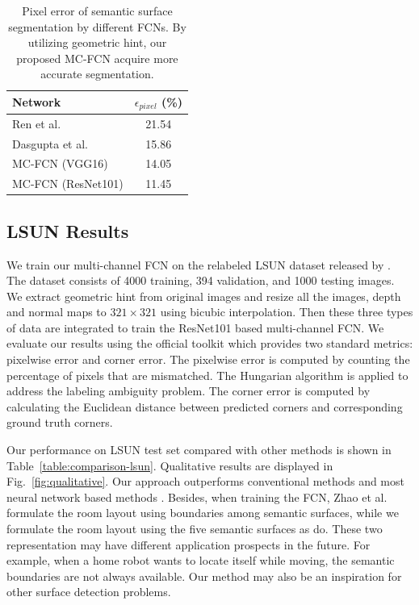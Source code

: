 \begin{table}
	\centering
	\begin{tabular}{l|c} 
		\hline
		Network & $\epsilon_{pixel}$ (\%)\\
		\hline
		Ren et al.~\cite{ren2016coarse} & 21.54 \\
		Dasgupta et al.~\cite{dasgupta2016delay} & 15.86 \\  \hline
		MC-FCN (VGG16)  & 14.05 \\
		MC-FCN (ResNet101) & 11.45 \\
		\hline
	\end{tabular}
	\caption{Pixel error of semantic surface segmentation by different FCNs. By utilizing geometric hint, our proposed MC-FCN acquire more accurate segmentation. }	
	\label{table:ablation}
\end{table}

\subsection{LSUN Results}
\label{sec:LSUN}
We train our multi-channel FCN on the relabeled LSUN dataset released by \cite{ren2016coarse}. The dataset consists of 4000 training, 394 validation, and 1000 testing images. We extract geometric hint from original images and resize all the images, depth and normal maps to $321\times321$ using bicubic interpolation. Then these three types of data are integrated to train the ResNet101 based multi-channel FCN. We evaluate our results using the official toolkit which provides two standard metrics: pixelwise error and corner error. The pixelwise error is computed by counting the percentage of pixels that are mismatched. The Hungarian algorithm is applied to address the labeling ambiguity problem.
The corner error is computed by calculating the Euclidean distance between predicted corners and corresponding ground truth corners.

Our performance on LSUN test set compared with other methods is shown in Table~\ref{table:comparison-lsun}. Qualitative results are displayed in Fig.~\ref{fig:qualitative}. Our approach outperforms conventional methods \cite{hedau2009recovering} and most neural network based methods  \cite{mallya2015learning,zhang2017learning,dasgupta2016delay,ren2016coarse,LeeRoomNet17}. 
%
Besides, when training the FCN, Zhao et al.~\cite{zhao2017physics} formulate the room layout using boundaries among semantic surfaces, while we formulate the room layout using the five semantic surfaces as \cite{dasgupta2016delay} do. These two representation may have different application prospects in the future. For example, when a home robot wants to locate itself while moving, the semantic boundaries are not always available. Our method may also be an inspiration for other surface detection problems.

